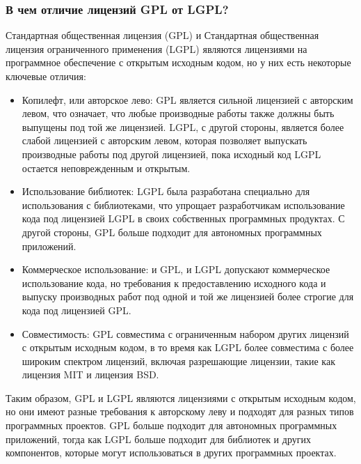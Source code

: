 \documentclass[letterpaper,10pt,russian]{sphinxmanual}
\begin{document}
\subsubsection{В чем отличие лицензий GPL от LGPL?}
\label{\detokenize{educational_materials/open_license/content:gpl-lgpl}}
\sphinxAtStartPar
Стандартная общественная лицензия (GPL) и Стандартная общественная лицензия ограниченного применения (LGPL) являются лицензиями на программное обеспечение с открытым исходным кодом, но у них есть некоторые ключевые отличия:
\begin{itemize}
\item {} 
\sphinxAtStartPar
Копилефт, или авторское лево: GPL является сильной лицензией с авторским левом, что означает, что любые производные работы также должны быть выпущены под той же лицензией. LGPL, с другой стороны, является более слабой лицензией с авторским левом, которая позволяет выпускать производные работы под другой лицензией, пока исходный код LGPL остается неповрежденным и открытым.

\item {} 
\sphinxAtStartPar
Использование библиотек: LGPL была разработана специально для использования с библиотеками, что упрощает разработчикам использование кода под лицензией LGPL в своих собственных программных продуктах. С другой стороны, GPL больше подходит для автономных программных приложений.

\item {} 
\sphinxAtStartPar
Коммерческое использование: и GPL, и LGPL допускают коммерческое использование кода, но требования к предоставлению исходного кода и выпуску производных работ под одной и той же лицензией более строгие для кода под лицензией GPL.

\item {} 
\sphinxAtStartPar
Совместимость: GPL совместима с ограниченным набором других лицензий с открытым исходным кодом, в то время как LGPL более совместима с более широким спектром лицензий, включая разрешающие лицензии, такие как лицензия MIT и лицензия BSD.

\end{itemize}

\sphinxAtStartPar
Таким образом, GPL и LGPL являются лицензиями с открытым исходным кодом, но они имеют разные требования к авторскому леву и подходят для разных типов программных проектов. GPL больше подходит для автономных программных приложений, тогда как LGPL больше подходит для библиотек и других компонентов, которые могут использоваться в других программных проектах.
\end{document}
